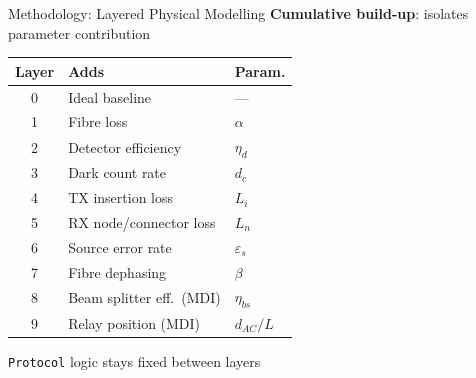 \documentclass[10pt]{beamer}
\newcommand{\lighthline}{\arrayrulecolor{gray!35}\hline\arrayrulecolor{black}}
\begin{document}
\begin{frame}{Methodology: Layered Physical Modelling}
    \textbf{Cumulative build-up}: isolates parameter contribution

    \vspace{0.08cm}
    \renewcommand{\arraystretch}{1.2}
    \scriptsize
    \begin{center}
    \begin{tabularx}{0.8\linewidth}{c>{\raggedright\arraybackslash}Xl}
        \toprule
        \textbf{Layer} & \textbf{Adds} & \textbf{Param.} \\
        \midrule
        0 & Ideal baseline               & — \\
        \lighthline
        1 & Fibre loss                   & $\alpha$ \\
        \lighthline
        2 & Detector efficiency          & $\eta_d$ \\
        \lighthline
        3 & Dark count rate              & $d_c$ \\
        \lighthline
        4 & TX insertion loss            & $L_i$ \\
        \lighthline
        5 & RX node/connector loss       & $L_n$ \\
        \lighthline
        6 & Source error rate            & $\varepsilon_s$ \\
        \lighthline
        7 & Fibre dephasing              & $\beta$ \\
        \lighthline
        8 & Beam splitter eff.\ (MDI)    & $\eta_{bs}$ \\
        \lighthline
        9 & Relay position (MDI)         & $d_{AC}/L$ \\
        \bottomrule
    \end{tabularx}
    \end{center}
    \normalsize
    \vspace{0.12cm}
    \texttt{Protocol} logic stays fixed between layers
\end{frame}
\end{document}
